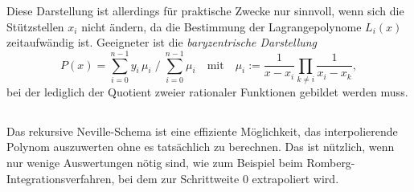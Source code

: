 Diese Darstellung ist allerdings für praktische Zwecke nur sinnvoll,
wenn sich die Stützstellen $x_i$ nicht ändern, da die Bestimmung der
Lagrangepolynome $L_i(x)$ zeitaufwändig ist. Geeigneter ist die
\emph{baryzentrische Darstellung} 
\begin{equation}
P(x) = \sum_{i=0}^{n-1} y_i\, \mu_i \; \Big/ \; \sum_{i=0}^{n-1}
\mu_i\quad\text{mit}\quad
\mu_i := \frac{1}{x-x_i}\prod_{k\neq i}\frac{1}{x_i-x_k},
\end{equation}
bei der lediglich der Quotient zweier rationaler Funktionen gebildet
werden muss. 

\subsection{}

Das rekursive Neville-Schema ist eine effiziente Möglichkeit, das
interpolierende Polynom auszuwerten ohne es tatsächlich zu
berechnen. Das ist nützlich, wenn nur wenige Auswertungen nötig sind,
wie zum Beispiel beim Romberg-Integrationsverfahren, bei dem zur
Schrittweite 0 extrapoliert wird.

